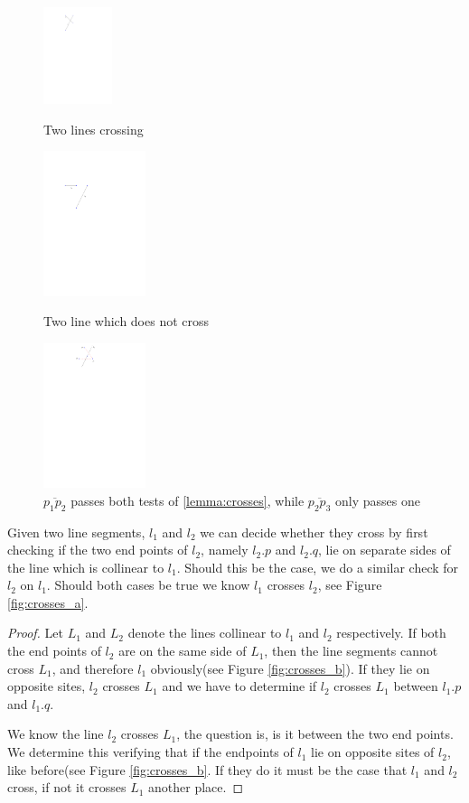 \begin{figure}[H]
		\includegraphics[width=2cm]{figures/crosses.pdf}
		\caption{Two lines crossing}
		\label{fig:crosses_a}
	\endminipage\hfill
		\includegraphics[width=3cm]{figures/crosses1.pdf}
		\caption{Two line which does not cross}
		\label{fig:crosses_b}
	\endminipage\hfill
		\includegraphics[width=3cm]{figures/crosses2.pdf}
		\caption{$\overline{p_1p_2}$ passes both tests of \ref{lemma:crosses}, while $\overline{p_2p_3}$ only passes one}
		\label{fig:crosses_c}
		\endminipage\hfill
\end{figure}

\begin{Lemma} \label{lemma:crosses}
    Given two line segments, $l_1$ and $l_2$ we can decide whether they cross
    by first checking if the two end points of $l_2$, namely $l_2.p$ and $l_2.q$, 
    lie on separate sides of the line which is collinear to $l_1$. Should this be
    the case, we do a similar check for $l_2$ on $l_1$. Should both cases be true
    we know $l_1$ crosses $l_2$, see Figure \ref{fig:crosses_a}.
\end{Lemma}

\begin{proof}
Let $L_1$ and $L_2$ denote the lines collinear to $l_1$ and $l_2$ respectively.
	If both the end points of $l_2$ are on the same side of $L_1$, then the line
	segments cannot cross $L_1$, and therefore $l_1$ obviously(see Figure
	\ref{fig:crosses_b}). If they lie on opposite sites, $l_2$ crosses $L_1$ and
	we have to determine if $l_2$ crosses $L_1$ between $l_1.p$ and $l_1.q$. 

We know the line $l_2$ crosses $L_1$, the question is, is it between the two
	end points. We determine this verifying that if the endpoints of $l_1$
	lie on opposite sites of $l_2$, like before(see Figure \ref{fig:crosses_b}.
	If they do it must be the case that $l_1$ and $l_2$ cross, if not it
	crosses $L_1$ another place.
\end{proof}

